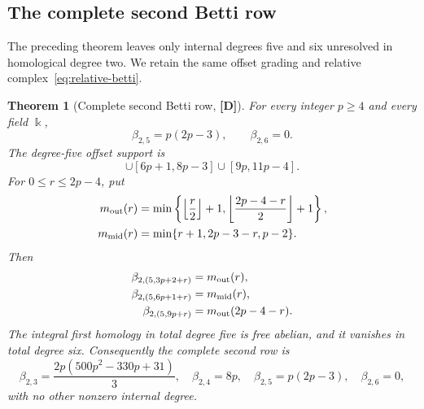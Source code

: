 \documentclass[11pt]{article}
\newtheorem{theorem}{Theorem}[section]
\theoremstyle{definition}
\theoremstyle{remark}
\newcommand{\kfield}{\Bbbk}
\begin{document}
\subsection{The complete second Betti row}

The preceding theorem leaves only internal degrees five and six unresolved in homological degree
two. We retain the same offset grading and relative complex~\eqref{eq:relative-betti}.

\begin{theorem}[Complete second Betti row, {\bf[D]}]
\label{thm:second-betti-row}
For every integer \(p\ge4\) and every field \(\kfield\),
\begin{equation}
\beta_{2,5}=p(2p-3),
\qquad
\beta_{2,6}=0.
\label{eq:second-betti-tail}
\end{equation}
The degree-five offset support is
\begin{equation}
[3p+2,5p-2]\cup[6p+1,8p-3]\cup[9p,11p-4].
\label{eq:degree-five-support}
\end{equation}
For \(0\le r\le2p-4\), put
\begin{align*}
m_{\rm out}(r)&=\min\left\{\left\lfloor\frac r2\right\rfloor+1,
 \left\lfloor\frac{2p-4-r}{2}\right\rfloor+1\right\},\\
m_{\rm mid}(r)&=\min\{r+1,2p-3-r,p-2\}.
\end{align*}
Then
\begin{align}
\beta_{2,(5,3p+2+r)}&=m_{\rm out}(r),\notag\\
\beta_{2,(5,6p+1+r)}&=m_{\rm mid}(r),\label{eq:degree-five-profile}\\
\beta_{2,(5,9p+r)}&=m_{\rm out}(2p-4-r).\notag
\end{align}
The integral first homology in total degree five is free abelian, and it vanishes in total degree
six. Consequently the complete second row is
\[
\beta_{2,3}=\frac{2p(500p^2-330p+31)}{3},\quad
\beta_{2,4}=8p,\quad
\beta_{2,5}=p(2p-3),\quad
\beta_{2,6}=0,
\]
with no other nonzero internal degree.
\end{theorem}
\end{document}
